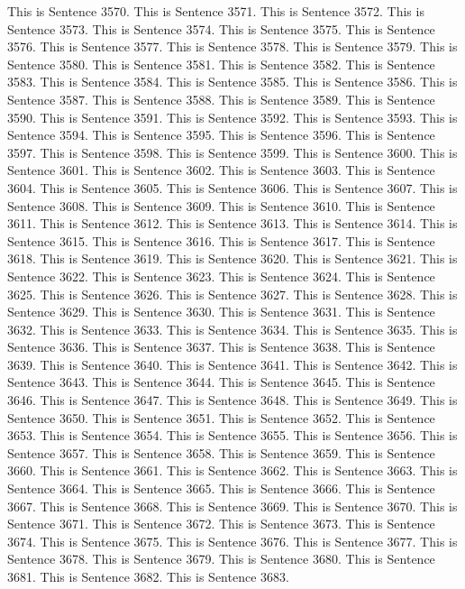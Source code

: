 \documentclass{article}
\begin{document}
This is Sentence 3570.
This is Sentence 3571.
This is Sentence 3572.
This is Sentence 3573.
This is Sentence 3574.
This is Sentence 3575.
This is Sentence 3576.
This is Sentence 3577.
This is Sentence 3578.
This is Sentence 3579.
This is Sentence 3580.
This is Sentence 3581.
This is Sentence 3582.
This is Sentence 3583.
This is Sentence 3584.
This is Sentence 3585.
This is Sentence 3586.
This is Sentence 3587.
This is Sentence 3588.
This is Sentence 3589.
This is Sentence 3590.
This is Sentence 3591.
This is Sentence 3592.
This is Sentence 3593.
This is Sentence 3594.
This is Sentence 3595.
This is Sentence 3596.
This is Sentence 3597.
This is Sentence 3598.
This is Sentence 3599.
This is Sentence 3600.
This is Sentence 3601.
This is Sentence 3602.
This is Sentence 3603.
This is Sentence 3604.
This is Sentence 3605.
This is Sentence 3606.
This is Sentence 3607.
This is Sentence 3608.
This is Sentence 3609.
This is Sentence 3610.
This is Sentence 3611.
This is Sentence 3612.
This is Sentence 3613.
This is Sentence 3614.
This is Sentence 3615.
This is Sentence 3616.
This is Sentence 3617.
This is Sentence 3618.
This is Sentence 3619.
This is Sentence 3620.
This is Sentence 3621.
This is Sentence 3622.
This is Sentence 3623.
This is Sentence 3624.
This is Sentence 3625.
This is Sentence 3626.
This is Sentence 3627.
This is Sentence 3628.
This is Sentence 3629.
This is Sentence 3630.
This is Sentence 3631.
This is Sentence 3632.
This is Sentence 3633.
This is Sentence 3634.
This is Sentence 3635.
This is Sentence 3636.
This is Sentence 3637.
This is Sentence 3638.
This is Sentence 3639.
This is Sentence 3640.
This is Sentence 3641.
This is Sentence 3642.
This is Sentence 3643.
This is Sentence 3644.
This is Sentence 3645.
This is Sentence 3646.
This is Sentence 3647.
This is Sentence 3648.
This is Sentence 3649.
This is Sentence 3650.
This is Sentence 3651.
This is Sentence 3652.
This is Sentence 3653.
This is Sentence 3654.
This is Sentence 3655.
This is Sentence 3656.
This is Sentence 3657.
This is Sentence 3658.
This is Sentence 3659.
This is Sentence 3660.
This is Sentence 3661.
This is Sentence 3662.
This is Sentence 3663.
This is Sentence 3664.
This is Sentence 3665.
This is Sentence 3666.
This is Sentence 3667.
This is Sentence 3668.
This is Sentence 3669.
This is Sentence 3670.
This is Sentence 3671.
This is Sentence 3672.
This is Sentence 3673.
This is Sentence 3674.
This is Sentence 3675.
This is Sentence 3676.
This is Sentence 3677.
This is Sentence 3678.
This is Sentence 3679.
This is Sentence 3680.
This is Sentence 3681.
This is Sentence 3682.
This is Sentence 3683.
\end{document}
